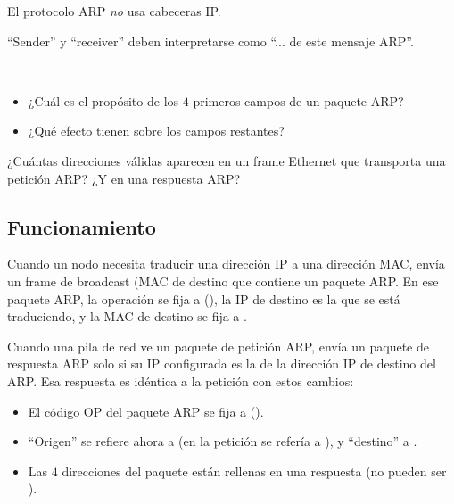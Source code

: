 \begin{remark}
El protocolo ARP \textit{no} usa cabeceras IP.
\end{remark}
\begin{remark}
``Sender'' y ``receiver'' deben interpretarse como ``... de este mensaje ARP''.
\end{remark}


\begin{exercise}\ \\[-0.5cm]
\begin{itemize}
\item ¿Cuál es el propósito de los $4$ primeros campos de un paquete ARP?
\item ¿Qué efecto tienen sobre los campos restantes?
\end{itemize}
\end{exercise}

\begin{exercise}
¿Cuántas direcciones válidas aparecen en un frame Ethernet que transporta una petición ARP?
¿Y en una respuesta ARP?
\end{exercise}


\subsection{Funcionamiento}\label{sec:layer3:arp:operation}

Cuando un nodo  necesita traducir una dirección IP a una dirección MAC, envía un frame de broadcast
(MAC de destino  que contiene un paquete ARP. 
En ese paquete ARP, la operación se fija a  (),
la IP de destino es la que se está traduciendo, y
la MAC de destino se fija a .

Cuando una pila de red  ve un paquete de petición ARP, 
envía un paquete de respuesta ARP solo si 
su IP configurada es la de la dirección IP de destino del ARP.
Esa respuesta es idéntica a la petición con estos cambios:
\begin{itemize}
\item El código OP del paquete ARP se fija a  ().
\item ``Origen'' se refiere ahora a  (en la petición se refería a ),
  y ``destino'' a .
\item Las $4$ direcciones del paquete están rellenas en una respuesta 
  (no pueden ser ).
\end{itemize}

